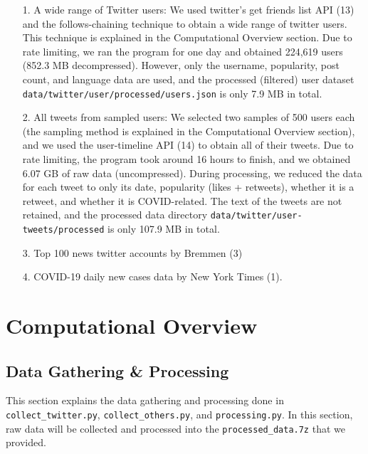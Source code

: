 \documentclass{article}
\newcommand{\C}{\texttt}
\begin{document}
    \begin{itemize}
        \item[1.] A wide range of Twitter users: We used twitter's get friends list API (13) and the follows-chaining technique to obtain a wide range of twitter users. This technique is explained in the Computational Overview section. Due to rate limiting, we ran the program for one day and obtained 224,619 users (852.3 MB decompressed). However, only the username, popularity, post count, and language data are used, and the processed (filtered) user dataset \C{data/twitter/user/processed/users.json} is only 7.9 MB in total.
         
        \item[2.] All tweets from sampled users: We selected two samples of 500 users each (the sampling method is explained in the Computational Overview section), and we used the user-timeline API (14) to obtain all of their tweets. Due to rate limiting, the program took around 16 hours to finish, and we obtained 6.07 GB of raw data (uncompressed). During processing, we reduced the data for each tweet to only its date, popularity (likes + retweets), whether it is a retweet, and whether it is COVID-related. The text of the tweets are not retained, and the processed data directory \C{data/twitter/user-tweets/processed} is only 107.9 MB in total.
        
        \item[3.] Top 100 news twitter accounts by Bremmen (3)
        \item[4.] COVID-19 daily new cases data by New York Times (1). 
    \end{itemize}
 
    \section{Computational Overview}

    \subsection*{Data Gathering \& Processing}
    \indent

    This section explains the data gathering and processing done in \verb|collect_twitter.py|, \verb|collect_others.py|, and \verb|processing.py|. In this section, raw data will be collected and processed into the \verb|processed_data.7z| that we provided.
\end{document}
